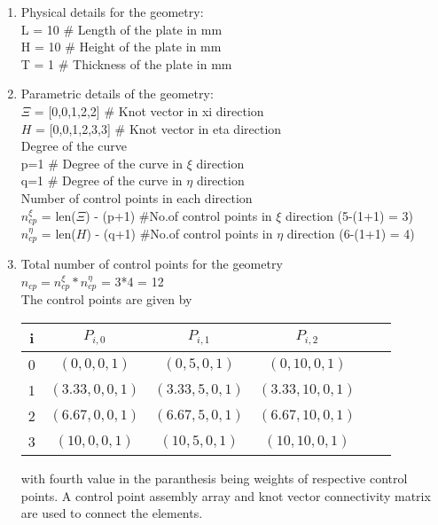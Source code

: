 \documentclass[11pt]{article}
\begin{document}
\begin{enumerate}
	\item Physical details for the geometry: \\
	L = 10 \qquad \# Length of the plate in mm \\
	H = 10 \qquad \# Height of the plate in mm \\
	T = 1 {} \qquad \# Thickness of the plate in mm \\
	
	\item Parametric details of the geometry: \\
	$\Xi$ =  [0,0,1,2,2] \qquad \# Knot vector in xi  direction \\
	$H$ = [0,0,1,2,3,3] \qquad \# Knot vector in eta direction \\
	
	Degree of the curve \\
	p=1 \qquad \# Degree of the curve in $\xi$  direction \\
	q=1 \qquad \# Degree of the curve in $\eta$ direction \\
	
	Number of control points in each direction \\
	$n_{cp}^{\xi}$  = len($\Xi$) - (p+1)  \qquad \#No.of control points in $\xi$
	direction (5-(1+1) = 3) \\
	$n_{cp}^{\eta}$ = len($H$) - (q+1)  \qquad \#No.of control points in $\eta$
	direction (6-(1+1) = 4) \\
	
	\item Total number of control points for the geometry \\
	$n_{cp} = n_{cp}^{\xi} * n_{cp}^{\eta}$ = 3*4 = 12\\
	The control points are given by
	\begin{center}
		\begin{tabular}{ |c|c|c|c|c|c| } 
			\hline
			i & $ P_{i,0} $ & $ P_{i,1} $ & $ P_{i,2} $   \\ \hline
			0 & $ (0,0,0,1) $ & $ (0,5,0,1) $ & $ (0,10,0,1) $  \\ \hline
			1 & $ (3.33,0,0,1) $ & $ (3.33,5,0,1) $ & $ (3.33,10,0,1) $  \\ \hline
			2 & $ (6.67,0,0,1) $ & $ (6.67,5,0,1) $ & $ (6.67,10,0,1) $  \\ \hline
			3 & $ (10,0,0,1) $ & $ (10,5,0,1) $ & $ (10,10,0,1) $  \\ \hline
		\end{tabular}
	\end{center}
	with fourth value in the paranthesis being weights of respective control points.
	A control point assembly array and knot vector connectivity matrix are used to connect the elements.
\end{enumerate}
\end{document}
